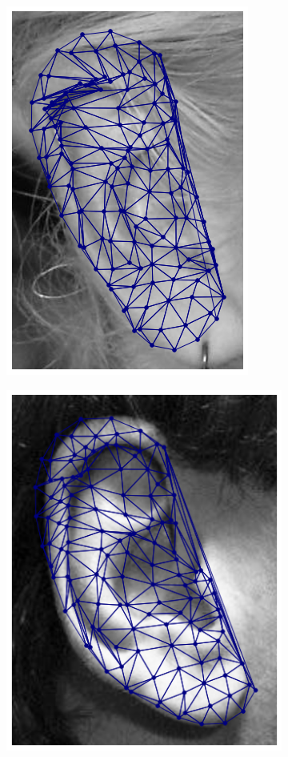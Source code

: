 \begin{figure}[h!]
\centering
    \begin{subfigure}[b]{0.115\textwidth}
            \includegraphics[height=1\textwidth]{supports/Fittings/fitting_ear_0000}
    \end{subfigure}
    \begin{subfigure}[b]{0.115\textwidth}
            \includegraphics[height=1\textwidth]{supports/Fittings/fitting_ear_0001}

\end{subfigure}
\end{figure}
